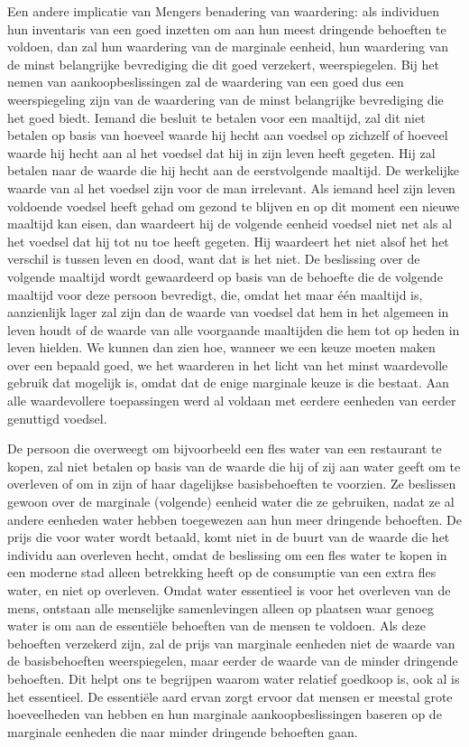 \documentclass[
  a5paper,
  smalldemyvopaper,11pt,twoside,onecolumn,openright,extrafontsizes,
hidelinks]{memoir}
\begin{document}
Een andere implicatie van Mengers benadering van waardering: als
individuen hun inventaris van een goed inzetten om aan hun meest
dringende behoeften te voldoen, dan zal hun waardering van de marginale
eenheid, hun waardering van de minst belangrijke bevrediging die dit
goed verzekert, weerspiegelen. Bij het nemen van aankoopbeslissingen zal
de waardering van een goed dus een weerspiegeling zijn van de waardering
van de minst belangrijke bevrediging die het goed biedt. Iemand die
besluit te betalen voor een maaltijd, zal dit niet betalen op basis van
hoeveel waarde hij hecht aan voedsel op zichzelf of hoeveel waarde hij
hecht aan al het voedsel dat hij in zijn leven heeft gegeten. Hij zal
betalen naar de waarde die hij hecht aan de eerstvolgende maaltijd. De
werkelijke waarde van al het voedsel zijn voor de man irrelevant. Als
iemand heel zijn leven voldoende voedsel heeft gehad om gezond te
blijven en op dit moment een nieuwe maaltijd kan eisen, dan waardeert
hij de volgende eenheid voedsel niet net als al het voedsel dat hij tot
nu toe heeft gegeten. Hij waardeert het niet alsof het het verschil is
tussen leven en dood, want dat is het niet. De beslissing over de
volgende maaltijd wordt gewaardeerd op basis van de behoefte die de
volgende maaltijd voor deze persoon bevredigt, die, omdat het maar één
maaltijd is, aanzienlijk lager zal zijn dan de waarde van voedsel dat
hem in het algemeen in leven houdt of de waarde van alle voorgaande
maaltijden die hem tot op heden in leven hielden. We kunnen dan zien
hoe, wanneer we een keuze moeten maken over een bepaald goed, we het
waarderen in het licht van het minst waardevolle gebruik dat mogelijk
is, omdat dat de enige marginale keuze is die bestaat. Aan alle
waardevollere toepassingen werd al voldaan met eerdere eenheden van
eerder genuttigd voedsel.

De persoon die overweegt om bijvoorbeeld een fles water van een
restaurant te kopen, zal niet betalen op basis van de waarde die hij of
zij aan water geeft om te overleven of om in zijn of haar dagelijkse
basisbehoeften te voorzien. Ze beslissen gewoon over de marginale
(volgende) eenheid water die ze gebruiken, nadat ze al andere eenheden
water hebben toegewezen aan hun meer dringende behoeften. De prijs die
voor water wordt betaald, komt niet in de buurt van de waarde die het
individu aan overleven hecht, omdat de beslissing om een fles water te
kopen in een moderne stad alleen betrekking heeft op de consumptie van
een extra fles water, en niet op overleven. Omdat water essentieel is
voor het overleven van de mens, ontstaan alle menselijke samenlevingen
alleen op plaatsen waar genoeg water is om aan de essentiële behoeften
van de mensen te voldoen. Als deze behoeften verzekerd zijn, zal de
prijs van marginale eenheden niet de waarde van de basisbehoeften
weerspiegelen, maar eerder de waarde van de minder dringende behoeften.
Dit helpt ons te begrijpen waarom water relatief goedkoop is, ook al is
het essentieel. De essentiële aard ervan zorgt ervoor dat mensen er
meestal grote hoeveelheden van hebben en hun marginale
aankoopbeslissingen baseren op de marginale eenheden die naar minder
dringende behoeften gaan.
\end{document}
